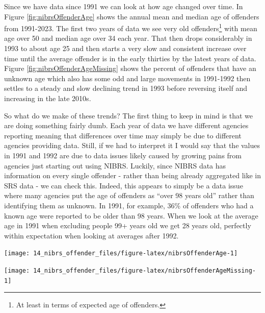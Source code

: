 \documentclass[
]{krantz}
\let\origfigure\figure
\let\endorigfigure\endfigure
\renewenvironment{figure}[1][2] {
    \expandafter\origfigure\expandafter[H]
} {
    \endorigfigure
}
\begin{document}
Since we have data since 1991 we can look at how age changed
over time. In Figure \ref{fig:nibrsOffenderAge} shows the
annual mean and median age of offenders from 1991-2023. The
first two years of data we see very old offenders\footnote{At
  least in terms of expected age of offenders.} with mean
age over 50 and median age over 34 each year. That then
drops considerably in 1993 to about age 25 and then starts a
very slow and consistent increase over time until the
average offender is in the early thirties by the latest
years of data. Figure \ref{fig:nibrsOffenderAgeMissing}
shows the percent of offenders that have an unknown age
which also has some odd and large movements in 1991-1992
then settles to a steady and slow declining trend in 1993
before reversing itself and increasing in the late 2010s.

So what do we make of these trends? The first thing to keep
in mind is that we are doing something fairly dumb. Each
year of data we have different agencies reporting meaning
that differences over time may simply be due to different
agencies providing data. Still, if we had to interpret it I
would say that the values in 1991 and 1992 are due to data
issues likely caused by growing pains from agencies just
starting out using NIBRS. Luckily, since NIBRS data has
information on every single offender - rather than being
already aggregated like in SRS data - we can check this.
Indeed, this appears to simply be a data issue where many
agencies put the age of offenders as ``over 98 years old''
rather than identifying them as unknown. In 1991, for
example, 36\% of offenders who had a known age were reported
to be older than 98 years. When we look at the average age
in 1991 when excluding people 99+ years old we get 28 years
old, perfectly within expectation when looking at averages
after 1992.

\begin{figure}

{\centering \texttt{[image: 14\_nibrs\_offender\_files/figure-latex/nibrsOffenderAge-1]} 

}

\caption{The mean and median age of offenders, 1991-2023.}\label{fig:nibrsOffenderAge}
\end{figure}

\begin{figure}

{\centering \texttt{[image: 14\_nibrs\_offender\_files/figure-latex/nibrsOffenderAgeMissing-1]} 

}

\caption{The percent of offender's age that is unknown, 1991-2023.}\label{fig:nibrsOffenderAgeMissing}
\end{figure}
\end{document}

